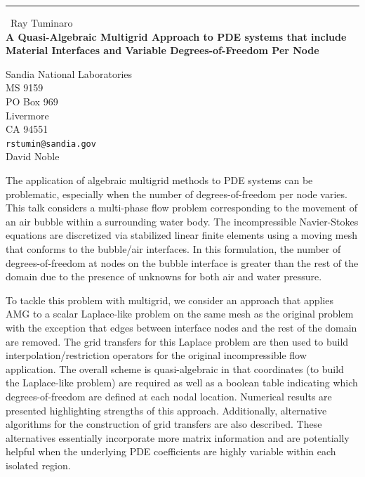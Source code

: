 \documentclass{report}
\begin{document}
\begin{center}
\rule{6in}{1pt} \
{\large Ray Tuminaro \\
{\bf A Quasi-Algebraic Multigrid Approach to PDE systems that include Material Interfaces and Variable Degrees-of-Freedom Per Node}}

Sandia National Laboratories \\ MS 9159 \\ PO Box 969 \\ Livermore \\ CA 94551
\\
{\tt rstumin@sandia.gov}\\
David Noble\end{center}

The application of algebraic multigrid methods to PDE systems can be
problematic, especially when the number of degrees-of-freedom per node
varies. This talk considers a multi-phase flow problem corresponding to
the movement of an air bubble within a surrounding water body. The
incompressible Navier-Stokes equations are discretized via stabilized
linear finite elements using a moving mesh that conforms to the
bubble/air interfaces. In this formulation, the number of
degrees-of-freedom at nodes on the bubble interface is greater than the
rest of the domain due to the presence of unknowns for both air and water
pressure.

To tackle this problem with multigrid, we consider an approach that
applies AMG to a scalar Laplace-like problem on the same mesh as the
original problem with the exception that edges between interface nodes
and the rest of the domain are removed. The grid transfers for this
Laplace problem are then used to build interpolation/restriction
operators for the original incompressible flow application. The overall
scheme is quasi-algebraic in that coordinates (to build the Laplace-like
problem) are required as well as a boolean table indicating which
degrees-of-freedom are defined at each nodal location. Numerical results
are presented highlighting strengths of this approach. Additionally,
alternative algorithms for the construction of grid transfers are also
described. These alternatives essentially incorporate more matrix
information and are potentially helpful when the underlying PDE
coefficients are highly variable within each isolated region.
\end{document}
